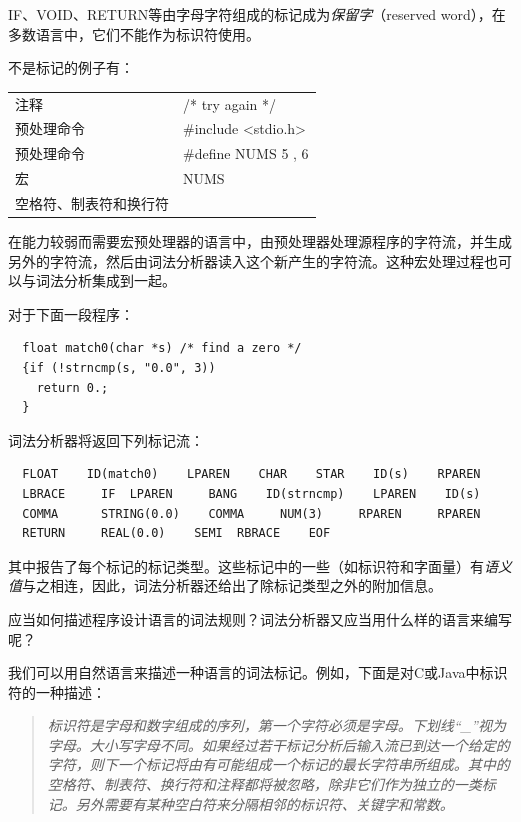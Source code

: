 \documentclass[cn,11pt,chinese]{elegantbook}
\begin{document}
IF、VOID、RETURN等由字母字符组成的标记成为\textit{保留字}（reserved word），在多数语言中，它们不能作为标识符使用。

不是标记的例子有：

\begin{center}
  \begin{tabular}{ll}
    注释 & /* try again */ \\
    预处理命令 & \#include <stdio.h> \\
    预处理命令 & \#define NUMS 5 , 6 \\
    宏 & NUMS \\
    空格符、制表符和换行符 & \\
  \end{tabular}
\end{center}

在能力较弱而需要宏预处理器的语言中，由预处理器处理源程序的字符流，并生成另外的字符流，然后由词法分析器读入这个新产生的字符流。这种宏处理过程也可以与词法分析集成到一起。

对于下面一段程序：

\begin{verbatim}
  float match0(char *s) /* find a zero */
  {if (!strncmp(s, "0.0", 3))
    return 0.;
  }
\end{verbatim}

词法分析器将返回下列标记流：

\begin{verbatim}
  FLOAT    ID(match0)    LPAREN    CHAR    STAR    ID(s)    RPAREN
  LBRACE     IF  LPAREN     BANG    ID(strncmp)    LPAREN    ID(s)
  COMMA      STRING(0.0)    COMMA     NUM(3)     RPAREN     RPAREN
  RETURN     REAL(0.0)    SEMI  RBRACE    EOF
\end{verbatim}

其中报告了每个标记的标记类型。这些标记中的一些（如标识符和字面量）有\textit{语义值}与之相连，因此，词法分析器还给出了除标记类型之外的附加信息。

应当如何描述程序设计语言的词法规则？词法分析器又应当用什么样的语言来编写呢？

我们可以用自然语言来描述一种语言的词法标记。例如，下面是对C或Java中标识符的一种描述：

\begin{quote}
  \textit{标识符是字母和数字组成的序列，第一个字符必须是字母。下划线“\_”视为字母。大小写字母不同。如果经过若干标记分析后输入流已到达一个给定的字符，则下一个标记将由有可能组成一个标记的最长字符串所组成。其中的空格符、制表符、换行符和注释都将被忽略，除非它们作为独立的一类标记。另外需要有某种空白符来分隔相邻的标识符、关键字和常数。}
\end{quote}
\end{document}
